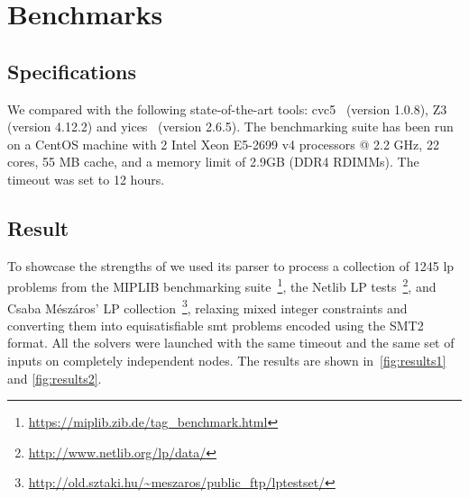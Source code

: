 \documentclass[runningheads]{llncs}
\begin{document}
\section{Benchmarks}
\label{sec:benchmarks}
\subsection*{Specifications}

We compared \dlinear with the following state-of-the-art tools: cvc5~\cite{ref:cvc5} (version 1.0.8), Z3~\cite{ref:z3} (version 4.12.2) and yices~\cite{ref:yices} (version 2.6.5).
The benchmarking suite has been run on a CentOS machine with 2 Intel Xeon E5-2699 v4 processors @ 2.2 GHz, 22 cores, 55 MB cache, and a memory limit of 2.9GB (DDR4 RDIMMs).
The timeout was set to 12 hours.

\subsection*{Result}

To showcase the strengths of \dlinear we used its parser to process a collection of 1245 \gls{lp} problems from the MIPLIB benchmarking suite~\footnote{\url{https://miplib.zib.de/tag_benchmark.html}}, the Netlib LP tests~\footnote{\url{http://www.netlib.org/lp/data/}}, and Csaba Mészáros' LP collection~\footnote{\url{http://old.sztaki.hu/~meszaros/public_ftp/lptestset/}}, relaxing mixed integer constraints and converting them into equisatisfiable \gls{smt} problems encoded using the SMT2 format.
All the solvers were launched with the same timeout and the same set of inputs on completely independent nodes.
The results are shown in~\autoref{fig:results1} and \autoref{fig:results2}.
\end{document}
